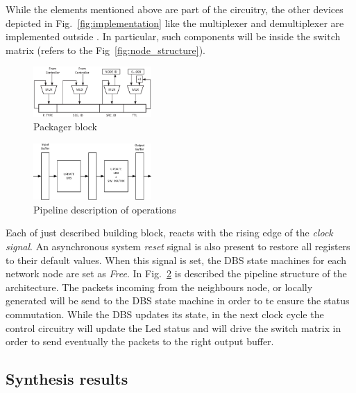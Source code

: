 While the elements mentioned above are part of the \disr{} circuitry,
the other devices depicted in Fig.~\ref{fig:implementation} like the
multiplexer and demultiplexer are implemented outside \disr{}. In
particular, such components will be inside the switch matrix  (refers
to the Fig~\ref{fig:node_structure}).

\begin{figure}
  \centering
  \includegraphics[width=0.40\textwidth]{pictures/packager.eps}
  \caption{Packager block}
 \label{fig:packager}
\end{figure}

\begin{figure}
  \centering
  \includegraphics[width=0.40\textwidth]{pictures/pipeline.eps}
  \caption{Pipeline description of \disr{} operations}
 \label{fig:pipeline}
\end{figure}

Each of just described building block, reacts with the rising edge  of
the \emph{clock signal}. An asynchronous system \emph{reset} signal is
also present to restore all registers to their default values. When
this signal is set, the DBS state machines for each network
node are set as \emph{Free}.  
In Fig.~\ref{fig:pipeline} is described the pipeline structure of the
\disr{} architecture. The packets incoming from the neighbours node, or
locally generated will be send to the DBS state machine in order to te
ensure the status commutation. While the DBS updates its state,  in the
next clock cycle the control circuitry will update the Led status and
will drive the switch matrix in order to send eventually the packets to
the  right output buffer.
\subsection{Synthesis results}

